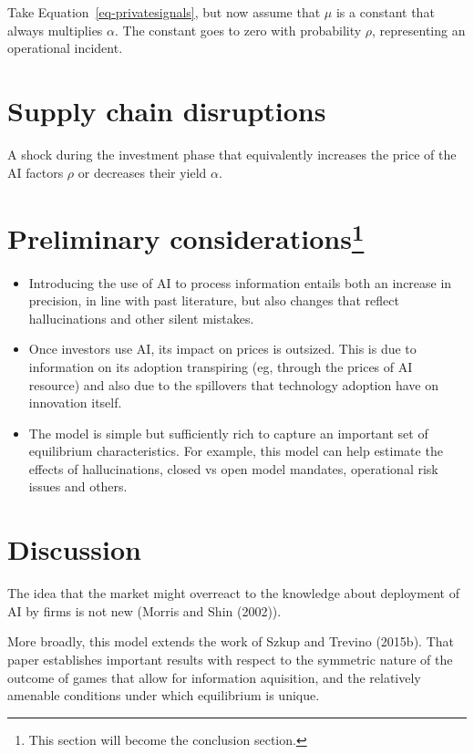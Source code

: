 \documentclass[
]{article}
\theoremstyle{plain}
\theoremstyle{remark}
\begin{document}
Take Equation~\ref{eq-privatesignals}, but now assume that \(\mu\) is a
constant that always multiplies \(\alpha\). The constant goes to zero
with probability \(\rho\), representing an operational incident.

\section{Supply chain disruptions}\label{supply-chain-disruptions}

A shock during the investment phase that equivalently increases the
price of the AI factors \(\rho\) or decreases their yield \(\alpha\).

\section[Preliminary considerations]{\texorpdfstring{Preliminary
considerations\footnote{This section will become the conclusion section.}}{Preliminary considerations}}\label{preliminary-considerationsconcl}

\begin{itemize}
\item
  Introducing the use of AI to process information entails both an
  increase in precision, in line with past literature, but also changes
  that reflect hallucinations and other silent mistakes.
\item
  Once investors use AI, its impact on prices is outsized. This is due
  to information on its adoption transpiring (eg, through the prices of
  AI resource) and also due to the spillovers that technology adoption
  have on innovation itself.
\item
  The model is simple but sufficiently rich to capture an important set
  of equilibrium characteristics. For example, this model can help
  estimate the effects of hallucinations, closed vs open model mandates,
  operational risk issues and others.
\end{itemize}

\section{Discussion}\label{discussion}

The idea that the market might overreact to the knowledge about
deployment of AI by firms is not new (Morris and Shin (2002)).

More broadly, this model extends the work of Szkup and Trevino (2015b).
That paper establishes important results with respect to the symmetric
nature of the outcome of games that allow for information aquisition,
and the relatively amenable conditions under which equilibrium is
unique.
\end{document}
